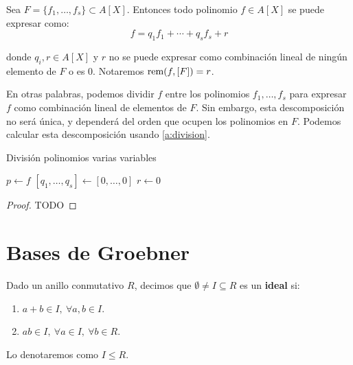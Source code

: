\begin{teorema}
    Sea $F=\{f_1,\dots, f_s\} \subset A[X]$. Entonces todo polinomio $f\in A[X]$ se puede expresar como:
    \begin{equation*}
        f = q_1f_1 + \cdots + q_sf_s + r
    \end{equation*}

    donde $q_i, r\in A[X]$ y $r$ no se puede expresar como combinación lineal de ningún elemento de $F$ o es $0$. Notaremos $\text{rem}(f, [F]) = r$.
\end{teorema}

En otras palabras, podemos dividir $f$ entre los polinomios $f_1, \dots, f_s$ para expresar $f$ como combinación lineal de elementos de $F$. Sin embargo, esta descomposición no será única, y dependerá del orden que ocupen los polinomios en $F$. Podemos calcular esta descomposición usando \autoref{a:division}.

\begin{algorithm}[hbt!]
    \caption{División polinomios varias variables}\label{a:division}
    $p\gets f$\;
    $\left[q_1,\dots, q_s\right] \gets \left[0,\dots, 0\right]$\;
    $r\gets 0$\;

\end{algorithm}

\begin{proof}
    TODO
\end{proof}
\section{Bases de Groebner}

\begin{definicion}
    Dado un anillo conmutativo $R$, decimos que $\emptyset \neq I \subseteq R$ es un \textbf{ideal} si:
    \begin{enumerate}
        \item $a+b\in I,\ \forall a,b\in I$.
        \item $ab\in I,\ \forall a\in I,\ \forall b\in R$.
    \end{enumerate}

    Lo denotaremos como $I\le R$.
\end{definicion}

